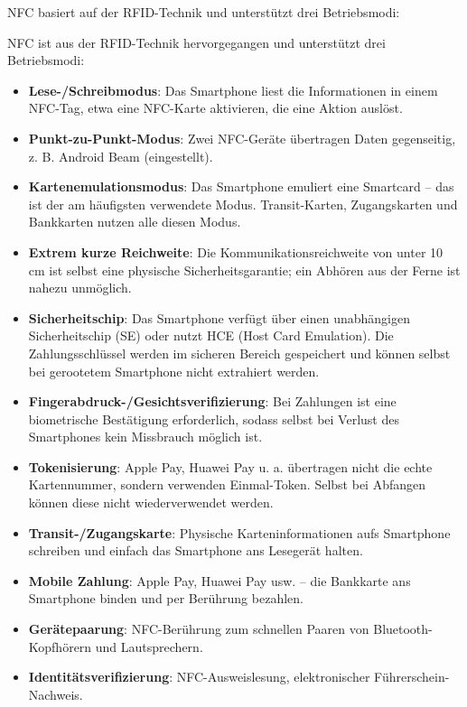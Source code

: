 
NFC basiert auf der RFID-Technik und unterstützt drei Betriebsmodi:


NFC ist aus der RFID-Technik hervorgegangen und unterstützt drei Betriebsmodi:

\begin{itemize}
  \item \textbf{Lese-/Schreibmodus}: Das Smartphone liest die Informationen in einem NFC-Tag, etwa eine NFC-Karte aktivieren, die eine Aktion auslöst.
  \item \textbf{Punkt-zu-Punkt-Modus}: Zwei NFC-Geräte übertragen Daten gegenseitig, z. B. Android Beam (eingestellt).
  \item \textbf{Kartenemulationsmodus}: Das Smartphone emuliert eine Smartcard – das ist der am häufigsten verwendete Modus. Transit-Karten, Zugangskarten und Bankkarten nutzen alle diesen Modus.
\end{itemize}


\begin{itemize}
  \item \textbf{Extrem kurze Reichweite}: Die Kommunikationsreichweite von unter 10 cm ist selbst eine physische Sicherheitsgarantie; ein Abhören aus der Ferne ist nahezu unmöglich.
  \item \textbf{Sicherheitschip}: Das Smartphone verfügt über einen unabhängigen Sicherheitschip (SE) oder nutzt HCE (Host Card Emulation). Die Zahlungsschlüssel werden im sicheren Bereich gespeichert und können selbst bei gerootetem Smartphone nicht extrahiert werden.
  \item \textbf{Fingerabdruck-/Gesichtsverifizierung}: Bei Zahlungen ist eine biometrische Bestätigung erforderlich, sodass selbst bei Verlust des Smartphones kein Missbrauch möglich ist.
  \item \textbf{Tokenisierung}: Apple Pay, Huawei Pay u. a. übertragen nicht die echte Kartennummer, sondern verwenden Einmal-Token. Selbst bei Abfangen können diese nicht wiederverwendet werden.
\end{itemize}


\begin{itemize}
  \item \textbf{Transit-/Zugangskarte}: Physische Karteninformationen aufs Smartphone schreiben und einfach das Smartphone ans Lesegerät halten.
  \item \textbf{Mobile Zahlung}: Apple Pay, Huawei Pay usw. – die Bankkarte ans Smartphone binden und per Berührung bezahlen.
  \item \textbf{Gerätepaarung}: NFC-Berührung zum schnellen Paaren von Bluetooth-Kopfhörern und Lautsprechern.
  \item \textbf{Identitätsverifizierung}: NFC-Ausweislesung, elektronischer Führerschein-Nachweis.
\end{itemize}

